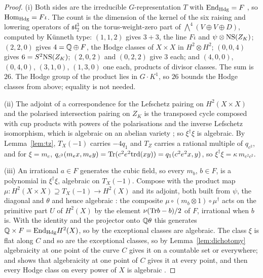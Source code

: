 \begin{proof}
(i) Both sides are the irreducible $G$-representation $T$ with $\mathrm{End}_{\mathrm{Hdg}}=F$ \cite[Prop.~21.2]{BMB26}, so $\mathrm{Hom}_{\mathrm{Hdg}}=F\iota$. The count is the dimension of the kernel of the six raising and lowering operators of $\mathfrak{sl}_{2}^{3}$ on the torus-weight-zero part of $\bigwedge^{4}(V\oplus V\oplus D)$, computed by K\"unneth type: $(1,1,2)$ gives $3+3$, the line $F\iota$ and $\psi\otimes\mathrm{NS}(Z_{K})$; $(2,2,0)$ gives $4=\mathbb{Q}\oplus F$, the Hodge classes of $X\times X$ in $H^{2}\otimes H^{2}$; $(0,0,4)$ gives $6=S^{2}\mathrm{NS}(Z_{K})$; $(2,0,2)$ and $(0,2,2)$ give $3$ each; and $(4,0,0)$, $(0,4,0)$, $(3,1,0)$, $(1,3,0)$ one each, products of divisor classes. The sum is $26$. The Hodge group of the product lies in $G\cdot K^{1}$, so $26$ bounds the Hodge classes from above; equality is not needed.

(ii) The adjoint of a correspondence for the Lefschetz pairing on $H^{2}(X\times X)$ and the polarised intersection pairing on $Z_{K}$ is the transposed cycle composed with cup products with powers of the polarisations and the inverse Lefschetz isomorphism, which is algebraic on an abelian variety \cite[\S2]{Kle68}; so $\xi^{\dagger}\xi$ is algebraic. By Lemma~\ref{lem:tz}, $T_{X}(-1)$ carries $-4q_{1}$ and $T_{Z}$ carries a rational multiple of $q_{c^{2}}$, and for $\xi=m_{e}$, $q_{c^{2}}(m_{e}x,m_{e}y)=\mathrm{Tr}(c^{2}e^{2}\mathrm{trd}(xy))=q_{1}(c^{2}e^{2}x,y)$, so $\xi^{\dagger}\xi=\kappa\,m_{e^{2}c^{2}}$.

(iii) An irrational $a\in F$ generates the cubic field, so every $m_{b}$, $b\in F$, is a polynomial in $\xi^{\dagger}\xi$, algebraic on $T_{X}(-1)$. Compose with the product map $\mu\colon H^{2}(X\times X)\supseteq T_{X}(-1)\to H^{2}(X)$ and its adjoint, both built from $\psi$, the diagonal and $\theta$ and hence algebraic \cite[Lem.~21.3]{BMB26}: the composite $\mu\circ(m_{b}\otimes1)\circ\mu^{\dagger}$ acts on the primitive part $U$ of $H^{2}(X)$ by the element $\nu(\mathrm{Tr} b-b)/2$ of $F$, irrational when $b$ is. With the identity and the projector onto $\mathbb{Q}\theta$ this generates $\mathbb{Q}\times F=\mathrm{End}_{\mathrm{Hdg}}H^{2}(X)$, so by \cite[Prop.~21.2]{BMB26} the exceptional classes are algebraic. The class $\xi$ is flat along $C$ and so are the exceptional classes, so by Lemma~\ref{lem:dichotomy} algebraicity at one point of the curve $C$ gives it on a countable set or everywhere; and \cite[Cor.~20.30]{BMB26} shows that algebraicity at one point of $C$ gives it at every point, and then every Hodge class on every power of $X$ is algebraic \cite[Thm.~21.7]{BMB26}.


\end{proof}
